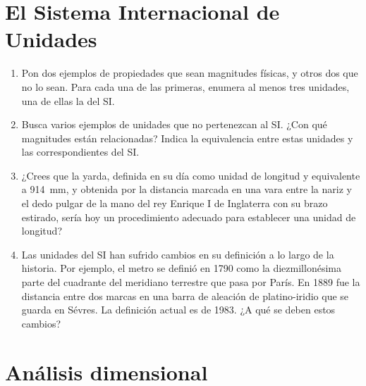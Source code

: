 \documentclass[
]{article}
\author{}
\date{}
\begin{document}
\hypertarget{el-sistema-internacional-de-unidades}{%
\section{El Sistema Internacional de
Unidades}\label{el-sistema-internacional-de-unidades}}

\begin{enumerate}
\def\labelenumi{\arabic{enumi}.}
\item
  Pon dos ejemplos de propiedades que sean magnitudes físicas, y otros
  dos que no lo sean. Para cada una de las primeras, enumera al menos
  tres unidades, una de ellas la del SI.
\item
  Busca varios ejemplos de unidades que no pertenezcan al SI. ¿Con qué
  magnitudes están relacionadas? Indica la equivalencia entre estas
  unidades y las correspondientes del SI.
\item
  ¿Crees que la yarda, definida en su día como unidad de longitud y
  equivalente a \SI{914}{\mm}, y obtenida por la distancia marcada en
  una vara entre la nariz y el dedo pulgar de la mano del rey Enrique I
  de Inglaterra con su brazo estirado, sería hoy un procedimiento
  adecuado para establecer una unidad de longitud?
\item
  Las unidades del SI han sufrido cambios en su definición a lo largo de
  la historia. Por ejemplo, el metro se definió en 1790 como la
  diezmillonésima parte del cuadrante del meridiano terrestre que pasa
  por París. En 1889 fue la distancia entre dos marcas en una barra de
  aleación de platino-iridio que se guarda en Sévres. La definición
  actual es de 1983. ¿A qué se deben estos cambios?
\end{enumerate}

\hypertarget{anuxe1lisis-dimensional}{%
\section{Análisis dimensional}\label{anuxe1lisis-dimensional}}
\end{document}
